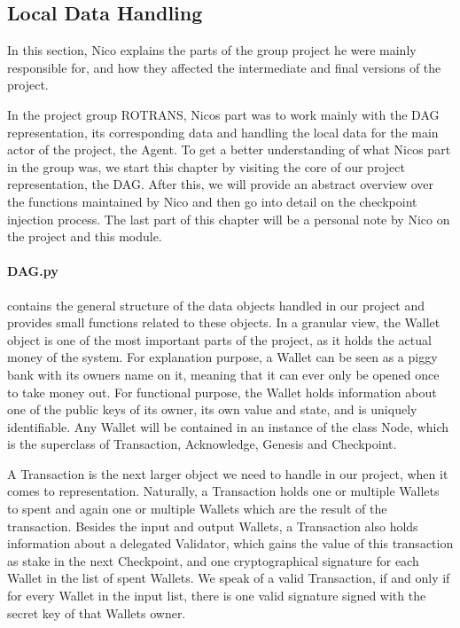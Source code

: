 \subsection{Local Data Handling}
\label{local_data_handling}
In this section, Nico explains the parts of the group project he were mainly responsible for, and how they affected the intermediate and final versions of the project.

In the project group ROTRANS, Nicos part was to work mainly with the DAG representation, its corresponding data and handling the local data for the main actor of the project, the Agent. To get a better understanding of what Nicos part in the group was, we start this chapter by visiting the core of our project representation, the DAG. After this, we will provide an abstract overview over the functions maintained by Nico and then go into detail on the checkpoint injection process. The last part of this chapter will be a personal note by Nico on the project and this module.

\paragraph{DAG.py} contains the general structure of the data objects handled in our project and provides small functions related to these objects. In a granular view, the Wallet object is one of the most important parts of the project, as it holds the actual money of the system. For explanation purpose, a Wallet can be seen as a piggy bank with its owners name on it, meaning that it can ever only be opened once to take money out. For functional purpose, the Wallet holds information about one of the public keys of its owner, its own value and state, and is uniquely identifiable.
Any Wallet will be contained in an instance of the class Node, which is the superclass of Transaction, Acknowledge, Genesis and Checkpoint.

A Transaction is the next larger object we need to handle in our project, when it comes to representation. Naturally, a Transaction holds one or multiple Wallets to spent and again one or multiple Wallets which are the result of the transaction. Besides the input and output Wallets, a Transaction also holds information about a delegated Validator, which gains the value of this transaction as stake in the next Checkpoint, and one cryptographical signature for each Wallet in the list of spent Wallets. We speak of a valid Transaction, if and only if for every Wallet in the input list, there is one valid signature signed with the secret key of that Wallets owner.

